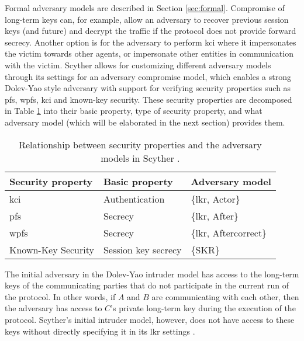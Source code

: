 Formal adversary models are described in Section \ref{sec:formal}. Compromise of long-term keys can, for example, allow an adversary to recover previous session keys (and future) and decrypt the traffic if the protocol does not provide forward secrecy. Another option is for the adversary to perform \gls{kci} where it impersonates the victim towards other agents, or impersonate other entities in communication with the victim. Scyther allows for customizing different adversary models through its settings for an adversary compromise model, which enables a strong Dolev-Yao style adversary with support for verifying security properties such as \gls{pfs}, \gls{wpfs}, \gls{kci} and known-key security. These security properties are decomposed in Table \ref{tab:sec-prop-adv-mod} into their basic property, type of security property, and what adversary model (which will be elaborated in the next section) provides them.

\begin{table}[h]
\centering
\begin{tabular}{|l|l|l|}
\hline
Security property                   & Basic property           & Adversary model    			\\ \hline
\gls{kci} 							 & Authentication           & \{\gls{lkr}, Actor\}        	\\ \hline
\gls{pfs}      						 & Secrecy                  & \{\gls{lkr}, After\}        \\ \hline
\gls{wpfs} 						     & Secrecy                  & \{\gls{lkr}, Aftercorrect\} \\ \hline
Known-Key Security                  & Session key secrecy 		 & \{SKR\}                		\\ \hline
\end{tabular}
\caption{Relationship between security properties and the adversary models in Scyther \cite{basin2010modeling}.}
\label{tab:sec-prop-adv-mod}
\end{table}

\newpage

The initial adversary in the Dolev-Yao intruder model has access to the long-term keys of the communicating parties that do not participate in the current run of the protocol. In other words, if $A$ and $B$ are communicating with each other, then the adversary has access to $C$'s private long-term key during the execution of the protocol. Scyther's initial intruder model, however, does not have access to these keys without directly specifying it in its \gls{lkr} settings \cite{basin2010modeling}.

